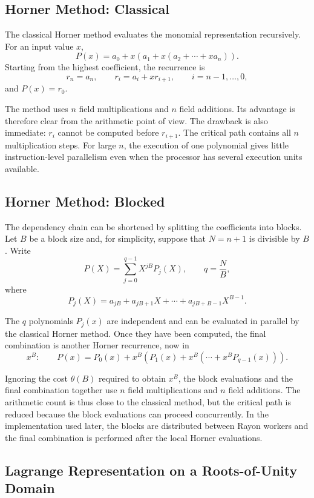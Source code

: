 \subsection{Horner Method: Classical}
\label{sec:horner}

The classical Horner method evaluates the monomial representation
recursively.  For an input value \(x\),
\[
P(x)
=
a_0+x\left(
a_1+x\left(
a_2+\cdots+x a_n
\right)\right).
\]
Starting from the highest coefficient, the recurrence is
\[
r_n=a_n,\qquad
r_i=a_i+xr_{i+1},
\qquad i=n-1,\ldots,0,
\]
and \(P(x)=r_0\).

The method uses \(n\) field multiplications and \(n\) field additions.  Its
advantage is therefore clear from the arithmetic point of view.  The
drawback is also immediate: \(r_i\) cannot be computed before
\(r_{i+1}\).  The critical path contains all \(n\) multiplication steps.
For large \(n\), the execution of one polynomial gives little
instruction-level parallelism even when the processor has several
execution units available.

\subsection{Horner Method: Blocked}
\label{sec:blocked-horner}

The dependency chain can be shortened by splitting the coefficients into
blocks.  Let \(B\) be a block size and, for simplicity, suppose that
\(N=n+1\) is divisible by \(B\).  Write
\[
P(X)
=
\sum_{j=0}^{q-1} X^{jB}P_j(X),
\qquad
q=\frac{N}{B},
\]
where
\[
P_j(X)
=
a_{jB}+a_{jB+1}X+\cdots+a_{jB+B-1}X^{B-1}.
\]

The \(q\) polynomials \(P_j(x)\) are independent and can be evaluated in
parallel by the classical Horner method.  Once they have been computed,
the final combination is another Horner recurrence, now in
\[
x^B:
\qquad
P(x)
=
P_0(x)
+
x^B\left(
P_1(x)+
x^B\left(
\cdots+
x^B P_{q-1}(x)
\right)\right).
\]

Ignoring the cost \(\theta(B)\) required to obtain \(x^B\), the block
evaluations and the final combination together use \(n\) field
multiplications and \(n\) field additions.  The arithmetic count is thus
close to the classical method, but the critical path is reduced because
the block evaluations can proceed concurrently.  In the implementation
used later, the blocks are distributed between Rayon workers and the final
combination is performed after the local Horner evaluations.

\subsection{Lagrange Representation on a Roots-of-Unity Domain}
\label{sec:lagrange}

